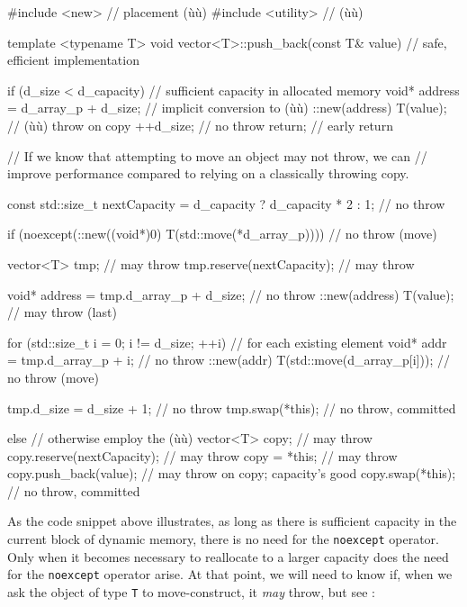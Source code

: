 \begin{emcppslisting}
#include <new>      // placement (ù{}ù)
#include <utility>  // (ù{}ù)

template <typename T>
void vector<T>::push_back(const T& value)  // safe, efficient implementation
{
    if (d_size < d_capacity)  // sufficient capacity in allocated memory
    {
        void* address = d_array_p + d_size;  // implicit conversion to (ù{}ù)
        ::new(address) T(value);             // (ù{}ù) throw on copy
        ++d_size;                            // no throw
        return;                              // early return
    }

    // If we know that attempting to move an object may not throw, we can
    // improve performance compared to relying on a classically throwing copy.

    const std::size_t nextCapacity = d_capacity ? d_capacity * 2
                                                : 1;              // no throw

    if (noexcept(::new((void*)0) T(std::move(*d_array_p))))  // no throw (move)
    {
        vector<T> tmp;                             // may throw
        tmp.reserve(nextCapacity);                 // may throw

        void* address = tmp.d_array_p + d_size;    // no throw
        ::new(address) T(value);                   // may throw (last)

        for (std::size_t i = 0; i != d_size; ++i)  // for each existing element
        {
            void* addr = tmp.d_array_p + i;          // no throw
            ::new(addr) T(std::move(d_array_p[i]));  // no throw (move)
        }

        tmp.d_size = d_size + 1;  // no throw
        tmp.swap(*this);          // no throw, committed
    }
    else                             // otherwise employ the (ù{}ù)
    {
        vector<T> copy;              // may throw
        copy.reserve(nextCapacity);  // may throw
        copy = *this;                // may throw
        copy.push_back(value);       // may throw on copy; capacity's good
        copy.swap(*this);            // no throw, committed
    }
}
\end{emcppslisting}
    

\noindent As the code snippet above illustrates, as long as there is sufficient
capacity in the current block of dynamic memory, there is no need for
the \lstinline!noexcept! operator. Only when it becomes necessary to
reallocate to a larger capacity does the need for the \lstinline!noexcept!
operator arise. At that point, we will need to know if, when we ask the
object of type \lstinline!T! to move-construct, it \emph{may} throw, but
see :

